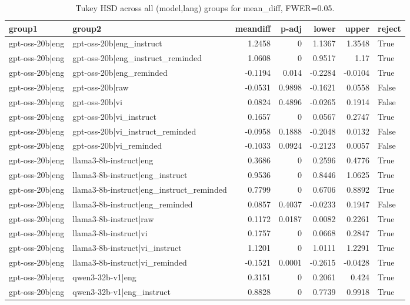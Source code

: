 \begin{table}
\caption{Tukey HSD across all (model,lang) groups for mean_diff, FWER=0.05.}
\label{tab:tukey_all_models_all_langs_mean_diff}
\begin{tabular}{l l r r r r l}
\toprule
group1 & group2 & meandiff & p-adj & lower & upper & reject \\
\midrule
gpt-oss-20b|eng & gpt-oss-20b|eng_instruct & 1.2458 & 0 & 1.1367 & 1.3548 & True \\
gpt-oss-20b|eng & gpt-oss-20b|eng_instruct_reminded & 1.0608 & 0 & 0.9517 & 1.17 & True \\
gpt-oss-20b|eng & gpt-oss-20b|eng_reminded & -0.1194 & 0.014 & -0.2284 & -0.0104 & True \\
gpt-oss-20b|eng & gpt-oss-20b|raw & -0.0531 & 0.9898 & -0.1621 & 0.0558 & False \\
gpt-oss-20b|eng & gpt-oss-20b|vi & 0.0824 & 0.4896 & -0.0265 & 0.1914 & False \\
gpt-oss-20b|eng & gpt-oss-20b|vi_instruct & 0.1657 & 0 & 0.0567 & 0.2747 & True \\
gpt-oss-20b|eng & gpt-oss-20b|vi_instruct_reminded & -0.0958 & 0.1888 & -0.2048 & 0.0132 & False \\
gpt-oss-20b|eng & gpt-oss-20b|vi_reminded & -0.1033 & 0.0924 & -0.2123 & 0.0057 & False \\
gpt-oss-20b|eng & llama3-8b-instruct|eng & 0.3686 & 0 & 0.2596 & 0.4776 & True \\
gpt-oss-20b|eng & llama3-8b-instruct|eng_instruct & 0.9536 & 0 & 0.8446 & 1.0625 & True \\
gpt-oss-20b|eng & llama3-8b-instruct|eng_instruct_reminded & 0.7799 & 0 & 0.6706 & 0.8892 & True \\
gpt-oss-20b|eng & llama3-8b-instruct|eng_reminded & 0.0857 & 0.4037 & -0.0233 & 0.1947 & False \\
gpt-oss-20b|eng & llama3-8b-instruct|raw & 0.1172 & 0.0187 & 0.0082 & 0.2261 & True \\
gpt-oss-20b|eng & llama3-8b-instruct|vi & 0.1757 & 0 & 0.0668 & 0.2847 & True \\
gpt-oss-20b|eng & llama3-8b-instruct|vi_instruct & 1.1201 & 0 & 1.0111 & 1.2291 & True \\
gpt-oss-20b|eng & llama3-8b-instruct|vi_reminded & -0.1521 & 0.0001 & -0.2615 & -0.0428 & True \\
gpt-oss-20b|eng & qwen3-32b-v1|eng & 0.3151 & 0 & 0.2061 & 0.424 & True \\
gpt-oss-20b|eng & qwen3-32b-v1|eng_instruct & 0.8828 & 0 & 0.7739 & 0.9918 & True \\

\end{tabular}
\end{table}
